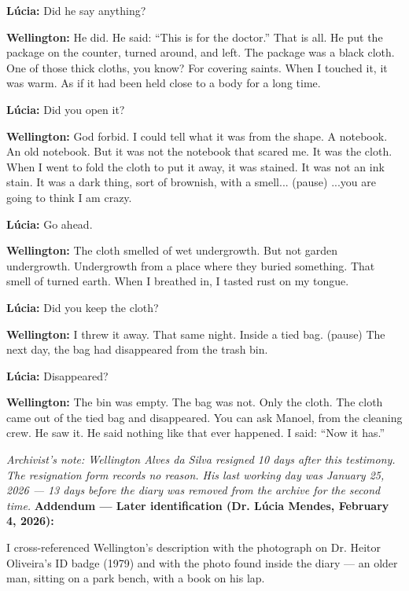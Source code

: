 \noindent \textbf{Lúcia:} Did he say anything?

\noindent \textbf{Wellington:} He did. He said: \textquotedblleft{}This is for the doctor.\textquotedblright{} That is all. He put the package on the counter, turned around, and left. The package was a black cloth. One of those thick cloths, you know? For covering saints. When I touched it, it was warm. As if it had been held close to a body for a long time.

\noindent \textbf{Lúcia:} Did you open it?

\noindent \textbf{Wellington:} God forbid. I could tell what it was from the shape. A notebook. An old notebook. But it was not the notebook that scared me. It was the cloth. When I went to fold the cloth to put it away, it was stained. It was not an ink stain. It was a dark thing, sort of brownish, with a smell... (pause) ...you are going to think I am crazy.

\noindent \textbf{Lúcia:} Go ahead.

\noindent \textbf{Wellington:} The cloth smelled of wet undergrowth. But not garden undergrowth. Undergrowth from a place where they buried something. That smell of turned earth. When I breathed in, I tasted rust on my tongue.

\noindent \textbf{Lúcia:} Did you keep the cloth?

\noindent \textbf{Wellington:} I threw it away. That same night. Inside a tied bag. (pause) The next day, the bag had disappeared from the trash bin.

\noindent \textbf{Lúcia:} Disappeared?

\noindent \textbf{Wellington:} The bin was empty. The bag was not. Only the cloth. The cloth came out of the tied bag and disappeared. You can ask Manoel, from the cleaning crew. He saw it. He said nothing like that ever happened. I said: \textquotedblleft{}Now it has.\textquotedblright{}

\noindent \textit{Archivist's note: Wellington Alves da Silva resigned 10 days after this testimony. The resignation form records no reason. His last working day was January 25, 2026 --- 13 days before the diary was removed from the archive for the second time.}
\noindent \textbf{Addendum --- Later identification (Dr. Lúcia Mendes, February 4, 2026):}

\noindent I cross-referenced Wellington's description with the photograph on Dr. Heitor Oliveira's ID badge (1979) and with the photo found inside the diary --- an older man, sitting on a park bench, with a book on his lap.

